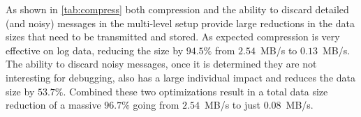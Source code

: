 As shown in \autoref{tab:compress} both compression and the ability to 
discard detailed (and noisy) messages in the multi-level setup provide 
large reductions in the data sizes that need to be transmitted and stored. 
As expected compression is very effective on log data, reducing the size 
by $94.5\%$ from $2.54$~MB/s to $0.13$~MB/s. The ability to discard noisy messages, 
once it is determined they are not interesting for debugging, also has a 
large individual impact and reduces the data size by $53.7\%$. Combined these 
two optimizations result in a total data size reduction of a massive $96.7\%$ 
going from $2.54$~MB/s to just $0.08$~MB/s.
